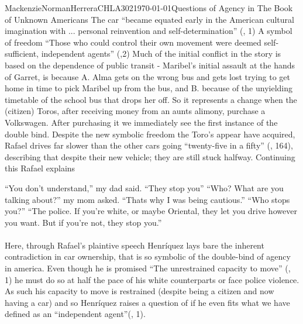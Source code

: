 \documentclass{article}
\begin{document}
\begin{mla}{Mackenzie}{Norman}{Herrera}{CHLA302}{\today}{Questions of Agency in The Book of Unknown Americans}
The car ``became equated early in the American cultural imagination with ... personal reinvention and self-determination'' (\cite{Uhlman2015-qx}, 1) A symbol of freedom ``Those who could control their own movement were deemed self-sufficient, independent agents'' (\cite{Uhlman2015-qx},2) Much of the initial conflict in the story is based on the dependence of public transit - Maribel's initial assault at the hands of Garret, is because A. Alma gets on the wrong bus and gets lost trying to get home in time to pick Maribel up from the bus, and B. because of the unyielding timetable of the school bus that drops her off. So it represents a change when the (citizen) Toros, after receiving money from an aunts alimony, purchase a Volkswagen. After purchasing it we immediately see the first instance of the double bind. Despite the new symbolic freedom the Toro's appear have acquired, Rafael drives far slower than the other cars going ``twenty-five in a fifty'' (\cite{Henriquez2014-sh}, 164), describing that despite their new vehicle; they are still stuck halfway. Continuing this Rafael explains


\noindent\linebreak
``You don't understand,'' my dad said. ``They stop you''
\noindent\linebreak
``Who? What are you talking about?'' my mom asked.
\noindent\linebreak
``Thats why I was being cautious.''
\noindent\linebreak
``Who stops you?''
\noindent\linebreak
``The police. If you're white, or maybe Oriental, they let you drive however you want. But if you're not, they stop you.''
\paragraph{}
Here, through Rafael's plaintive speech Henríquez lays bare the inherent contradiction in car ownership, that is so symbolic of the double-bind of agency in america. Even though he is promised ``The unrestrained capacity to move'' (\cite{Uhlman2015-qx}, 1) he must do so at half the pace of his white counterparts or face police violence. As such his capacity to move is restrained (despite being a citizen and now having a car) and so Henríquez raises a question of if he even fits what we have defined as an ``independent agent''(\cite{Uhlman2015-qx}, 1).




\end{mla}
\end{document}
